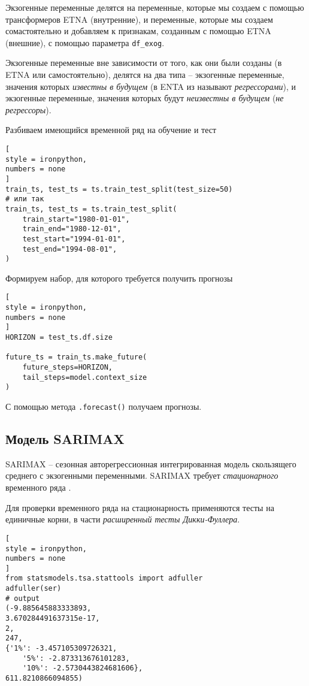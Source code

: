 \documentclass[%
	11pt,
	a4paper,
	utf8,
		]{article}
\begin{document}
Экзогенные переменные делятся на переменные, которые мы создаем с помощью трансформеров ETNA (внутренние), и переменные, которые мы создаем сомастоятельно и добавляем к признакам, созданным с помощью ETNA (внешние), с помощью параметра \verb|df_exog|. 

Экзогенные переменные вне зависимости от того, как они были созданы (в ETNA или самостоятельно), делятся на два типа -- экзогенные переменные, значения которых \emph{известны в будущем} (в ENTA из называют \emph{регрессорами}), и экзогенные переменные, значения которых будут \emph{неизвестны в будущем} (\emph{не регрессоры}).

Разбиваем имеющийся временной ряд на обучение и тест
\begin{lstlisting}[
style = ironpython,
numbers = none
]
train_ts, test_ts = ts.train_test_split(test_size=50)
# или так
train_ts, test_ts = ts.train_test_split(
    train_start="1980-01-01",
    train_end="1980-12-01",
    test_start="1994-01-01",
    test_end="1994-08-01",
)
\end{lstlisting}

Формируем набор, для которого требуется получить прогнозы
\begin{lstlisting}[
style = ironpython,
numbers = none
]
HORIZON = test_ts.df.size

future_ts = train_ts.make_future(
    future_steps=HORIZON,
    tail_steps=model.context_size
)
\end{lstlisting}

С помощью метода \verb|.forecast()| получаем прогнозы. 

\subsection{Модель SARIMAX}

SARIMAX -- сезонная авторегрессионная интегрированная модель скользящего среднего с экзогенными переменными. SARIMAX требует \emph{стационарного} временного ряда \cite[]{gruzdev:time-series-2022}.

Для проверки временного ряда на стационарность применяются тесты на единичные корни, в части \emph{расширенный тесты Дикки-Фуллера}.
\begin{lstlisting}[
style = ironpython,
numbers = none	
]
from statsmodels.tsa.stattools import adfuller
adfuller(ser)
# output
(-9.885645883333893,
3.670284491637315e-17,
2,
247,
{'1%': -3.457105309726321,
	'5%': -2.873313676101283,
	'10%': -2.5730443824681606},
611.8210866094855)
\end{lstlisting}
\end{document}
